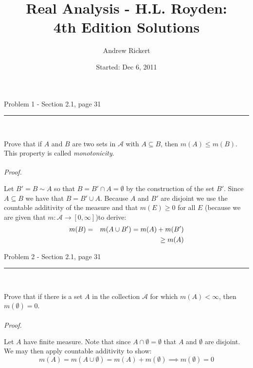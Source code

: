 \documentclass[11pt,reqno]{article}
\title{Real Analysis - H.L. Royden: \\  4th Edition Solutions}
\author{Andrew Rickert}
\date{Started: Dec 6, 2011}                                           %
\begin{document}
\maketitle



\begin{flushleft} 
Problem 1 - Section 2.1, page 31\\
\rule{500pt}{1pt}\\
\end{flushleft} 

Prove that if $A$ and $B$ are two sets in $\mathcal{A}$ with $A \subseteq B$, then $m(A) \le m(B)$. This property is called \emph{monotonicity}.
\\\\ \emph{Proof.}

Let $B' = B \sim A$ so that $B = B' \cap A = \emptyset$ by the construction of the set $B'$. Since $A \subseteq B$ we have that $B = B' \cup A$. Because $A$ and $B'$ are disjoint we use the countable additivity of the measure and that $m(E) \ge 0$ for all $E$ (because we are given that $m: \mathcal{A} \to [0,\infty]$)to derive:
\begin{eqnarray*}
m(B) &=& m(A \cup B') = m(A) + m(B') \\
        &&\hspace{53px}\ge m(A)
\end{eqnarray*}

\begin{flushleft} 
Problem 2 - Section 2.1, page 31\\
\rule{500pt}{1pt}\\
\end{flushleft} 

Prove that if there is a set $A$ in the collection $\mathcal{A}$ for which $m(A) < \infty$, then $m(\emptyset) = 0$.
\\\\ \emph{Proof.}

Let $A$ have finite measure. Note that since $A \cap \emptyset = \emptyset$ that $A$ and $\emptyset$ are disjoint. We may then apply countable additivity to show:
\begin{equation*}
m(A) = m(A \cup \emptyset) = m(A) + m(\emptyset) \implies m(\emptyset) = 0
\end{equation*}
\end{document}
